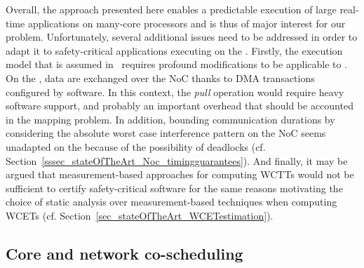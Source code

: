 \documentclass[main.tex]{subfiles}
\begin{document}
Overall, the approach presented here enables a predictable execution of large
real-time applications on many-core processors and is thus of major interest
for our problem. Unfortunately, several additional issues need to be addressed
in order to adapt it to safety-critical applications executing on the
\mppalong. Firstly, the execution model that is assumed in~\cite{PuffitschNP15}
requires profound modifications to be applicable to \mppalong. On the
\mppalong, data are exchanged over the NoC thanks to DMA transactions
configured by software. In this context, the \emph{pull} operation would
require heavy software support, and probably an important overhead that should
be accounted in the mapping problem. In addition, bounding communication
durations by considering the absolute worst case interference pattern on the
NoC seems unadapted on the \mppalong because of the possibility of deadlocks
(cf. Section~\ref{sssec_stateOfTheArt_Noc_timingguarantees}). And finally, it
may be argued that measurement-based approaches for computing WCTTs would not
be sufficient to certify safety-critical software for the same reasons
motivating the choice of static analysis over measurement-based techniques when
computing WCETs (cf. Section~\ref{sec_stateOfTheArt_WCETestimation}).


\subsection{Core and network co-scheduling}
\end{document}
